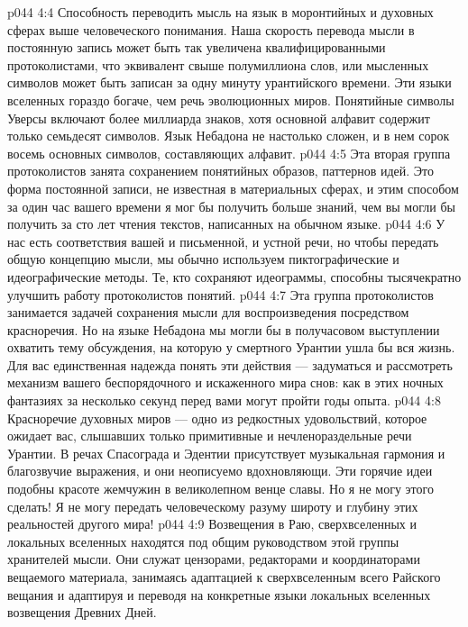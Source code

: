 \vs p044 4:4 Способность переводить мысль на язык в моронтийных и духовных сферах выше человеческого понимания. Наша скорость перевода мысли в постоянную запись может быть так увеличена квалифицированными протоколистами, что эквивалент свыше полумиллиона слов, или мысленных символов может быть записан за одну минуту урантийского времени. Эти языки вселенных гораздо богаче, чем речь эволюционных миров. Понятийные символы Уверсы включают более миллиарда знаков, хотя основной алфавит содержит только семьдесят символов. Язык Небадона не настолько сложен, и в нем сорок восемь основных символов, составляющих алфавит.
\vs p044 4:5 \pc {}\bibnobreakspace {} Эта вторая группа протоколистов занята сохранением понятийных образов, паттернов идей. Это форма постоянной записи, не известная в материальных сферах, и этим способом за один час вашего времени я мог бы получить больше знаний, чем вы могли бы получить за сто лет чтения текстов, написанных на обычном языке.
\vs p044 4:6 \pc {}\bibnobreakspace {} У нас есть соответствия вашей и письменной, и устной речи, но чтобы передать общую концепцию мысли, мы обычно используем пиктографические и идеографические методы. Те, кто сохраняют идеограммы, способны тысячекратно улучшить работу протоколистов понятий.
\vs p044 4:7 \pc {}\bibnobreakspace {} Эта группа протоколистов занимается задачей сохранения мысли для воспроизведения посредством красноречия. Но на языке Небадона мы могли бы в получасовом выступлении охватить тему обсуждения, на которую у смертного Урантии ушла бы вся жизнь. Для вас единственная надежда понять эти действия --- задуматься и рассмотреть механизм вашего беспорядочного и искаженного мира снов: как в этих ночных фантазиях за несколько секунд перед вами могут пройти годы опыта.
\vs p044 4:8 Красноречие духовных миров --- одно из редкостных удовольствий, которое ожидает вас, слышавших только примитивные и нечленораздельные речи Урантии. В речах Спасограда и Эдентии присутствует музыкальная гармония и благозвучие выражения, и они неописуемо вдохновляющи. Эти горячие идеи подобны красоте жемчужин в великолепном венце славы. Но я не могу этого сделать! Я не могу передать человеческому разуму широту и глубину этих реальностей другого мира!
\vs p044 4:9 \pc {}\bibnobreakspace {} Возвещения в Раю, сверхвселенных и локальных вселенных находятся под общим руководством этой группы хранителей мысли. Они служат цензорами, редакторами и координаторами вещаемого материала, занимаясь адаптацией к сверхвселенным всего Райского вещания и адаптируя и переводя на конкретные языки локальных вселенных возвещения Древних Дней.
